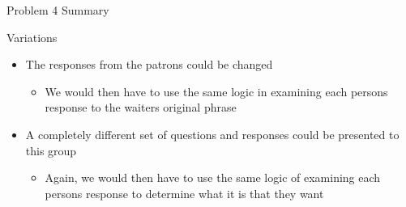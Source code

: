\begin{summary}{Problem 4 Summary}
\begin{statement}{Variations}
\begin{itemize}
\begin{itemize}
            \end{itemize}
            \item The responses from the patrons could be changed
            \begin{itemize}
                \item We would then have to use the same logic in examining each persons response to the waiters original phrase
            \end{itemize}
            \item A completely different set of questions and responses could be presented to this group
            \begin{itemize}
                \item Again, we would then have to use the same logic of examining each persons response to determine what it is that they want
            \end{itemize}
        \end{itemize}
    \end{statement}
\end{summary}

